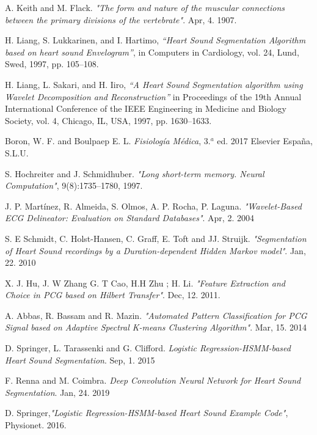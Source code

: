 \begin{thebibliography}{9}
A. Keith and M. Flack. \textit{"The form and nature of the muscular connections between the primary divisions of the vertebrate"}. Apr, 4. 1907.

H. Liang, S. Lukkarinen, and I. Hartimo, \textit{“Heart Sound Segmentation Algorithm based on heart sound Envelogram”}, in Computers in Cardiology, vol. 24, Lund, Swed, 1997, pp. 105–108.

H. Liang, L. Sakari, and H. Iiro, \textit{“A Heart Sound Segmentation algorithm using Wavelet Decomposition and Reconstruction”} in Proceedings of the 19th Annual International Conference of the IEEE Engineering in Medicine and Biology Society, vol. 4, Chicago, IL, USA, 1997, pp. 1630–1633.

Boron, W. F. and Boulpaep E. L. \textit{Fisiología Médica}, 3.$^a$ ed. 2017 Elsevier España, S.L.U.

S. Hochreiter and J. Schmidhuber. \textit{"Long short-term memory. Neural Computation"}, 9(8):1735–1780, 1997.

J. P. Martínez, R. Almeida, S. Olmos, A. P. Rocha, P. Laguna. \textit{"Wavelet-Based ECG Delineator: Evaluation on Standard Databases"}. Apr, 2. 2004

S. E Schmidt, C. Holst-Hansen, C. Graff, E. Toft and JJ. Struijk. \textit{"Segmentation of Heart Sound recordings by a Duration-dependent Hidden Markov model"}. Jan, 22. 2010

X. J.  Hu,  J. W Zhang  G. T Cao,  H.H Zhu ;  H. Li. \textit{"Feature Extraction and Choice in PCG based on Hilbert Transfer"}. Dec, 12. 2011.

A. Abbas, R. Bassam and R. Mazin. \textit{"Automated Pattern Classification for PCG Signal based on Adaptive Spectral K-means Clustering Algorithm"}. Mar, 15. 2014

D. Springer, L. Tarassenki and G. Clifford. \textit{Logistic Regression-HSMM-based Heart Sound Segmentation}. Sep, 1. 2015

F. Renna and M. Coimbra. \textit{Deep Convolution Neural Network for Heart Sound Segmentation}. Jan, 24. 2019

D. Springer,\textit{"Logistic Regression-HSMM-based Heart Sound Example Code"}, Physionet. 2016.



\end{thebibliography}
